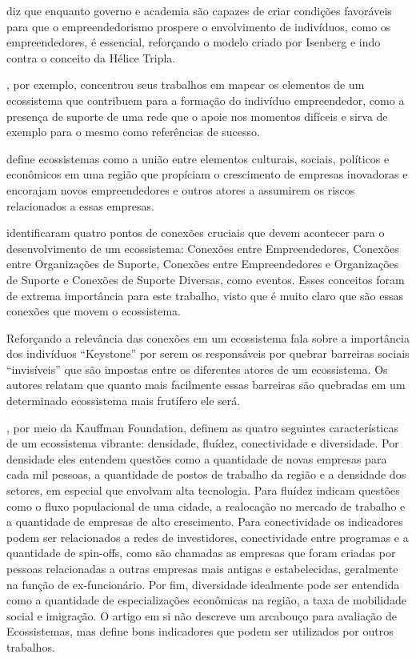 diz que enquanto governo e academia são capazes de criar condições favoráveis para que o empreendedorismo prospere o envolvimento de indivíduos, como os empreendedores, é essencial, reforçando o modelo criado por Isenberg e indo contra o conceito da Hélice Tripla.

, por exemplo, concentrou seus trabalhos em mapear os elementos de um ecossistema que contribuem para a formação do indivíduo empreendedor, como a presença de suporte de uma rede que o apoie nos momentos difíceis e sirva de exemplo para o mesmo como referências de sucesso. 

 define ecossistemas como a união entre elementos culturais, sociais, políticos e econômicos em uma região que propíciam o crescimento de empresas inovadoras e encorajam novos empreendedores e outros atores a assumirem os riscos relacionados a essas empresas.

 identificaram quatro pontos de conexões cruciais que devem acontecer para o desenvolvimento de um ecossistema: Conexões entre Empreendedores, Conexões entre Organizações de Suporte, Conexões entre Empreendedores e Organizações de Suporte e Conexões de Suporte Diversas, como eventos. Esses conceitos foram de extrema importância para este trabalho, visto que é muito claro que são essas conexões que movem o ecossistema.

Reforçando a relevância das conexões em um ecossistema  fala sobre a importância dos indivíduos ``Keystone'' por serem os responsáveis por quebrar barreiras sociais ``invisíveis'' que são impostas entre os diferentes atores de um ecossistema. Os autores relatam que quanto mais facilmente essas barreiras são quebradas em um determinado ecossistema mais frutífero ele será.

, por meio da Kauffman Foundation, definem as quatro seguintes características de um ecossistema vibrante: densidade, fluídez, conectividade e diversidade. Por densidade eles entendem questões como a quantidade de novas empresas para cada mil pessoas, a quantidade de postos de trabalho da região e a densidade dos setores, em especial que envolvam alta tecnologia. Para fluídez indicam questões como o fluxo populacional de uma cidade, a realocação no mercado de trabalho e a quantidade de empresas de alto crescimento. Para conectividade os indicadores podem ser relacionados a redes de investidores, conectividade entre programas e a quantidade de spin-offs, como são chamadas as empresas que foram criadas por pessoas relacionadas a outras empresas mais antigas e estabelecidas, geralmente na função de ex-funcionário. Por fim, diversidade idealmente pode ser entendida como a quantidade de especializações econômicas na região, a taxa de mobilidade social e imigração. O artigo em si não descreve um arcabouço para avaliação de Ecossistemas, mas define bons indicadores que podem ser utilizados por outros trabalhos.

